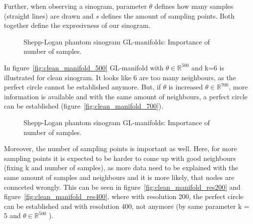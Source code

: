 Further, when observing a sinogram, parameter $\theta$ defines how many samples (straight lines) are drawn
and $s$ defines the amount of sampling points. Both together define the expresivness of our sinogram.

\begin{figure}[H]
    \centering
    \caption{Shepp-Logan phantom sinogram GL-manifolds: Importance of number of samples.}
\end{figure}

In figure~\ref{fig:clean_manifold_500} GL-manifold with $\theta \in \mathbb{R}^{500}$ and k=6 is illustrated
for clean sinogram. It looks like 6 are too many neighbours, as the perfect circle cannot be established anymore.
But, if $\theta$ is increased $\theta \in \mathbb{R}^{700}$, more information is available and with the same amount of neighbours,
a perfect circle can be established (figure~\ref{fig:clean_manifold_700}).

\begin{figure}[H]
    \centering
    \caption{Shepp-Logan phantom sinogram GL-manifolds: Importance of number of samples.}
\end{figure}

Moreover, the number of sampling points is important as well.
Here, for more sampling points it is expected to be harder to come up with good neighbours (fixing k and number of samples),
as more data need to be explained with the same amount of samples and neighbours and it is more likely, that nodes are connceted wrongly.
This can be seen in figure~\ref{fig:clean_manifold_res200} and figure~\ref{fig:clean_manifold_res400}, where with resolution 
200, the perfect circle can be established and with resolution 400, not anymore (by same parameter k = 5 and $\theta \in \mathbb{R}^{500}$ ).

